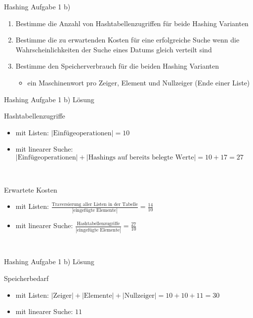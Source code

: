 	\begin{frame}{Hashing Aufgabe 1 b)}
		\begin{enumerate}
			\item Bestimme die Anzahl von Hashtabellenzugriffen für beide Hashing Varianten
			\item Bestimme die zu erwartenden Kosten für eine erfolgreiche Suche wenn die Wahrscheinlichkeiten der Suche eines Datums gleich verteilt sind
			\item Bestimme den Speicherverbrauch für die beiden Hashing Varianten
			\begin{itemize}
				\item ein Maschinenwort pro Zeiger, Element und Nullzeiger (Ende einer Liste) 
			\end{itemize}  
		\end{enumerate}
	\end{frame}

	\begin{frame} {Hashing Aufgabe 1 b) Lösung}
		\begin{block}{Hashtabellenzugriffe}
			\begin{itemize}
				\item mit Listen: $|\text{Einfügeoperationen}| = 10$
				\item mit linearer Suche: $|\text{Einfügeoperationen}| + |\text{Hashings auf bereits belegte Werte}| = 10 + 17 = 27 $
			\end{itemize}
		\end{block}
		\ \\
		\begin{block}{Erwartete Kosten}
			\begin{itemize}
				\item mit Listen: $ \frac{\text{Traversierung aller Listen in der Tabelle}}{|\text{eingefügte Elemente}|}= \frac{14}{10}  $
				\item mit linearer Suche: $ \frac{\text{Hashtabellenzugriffe}}{|\text{eingefügte Elemente}|} =  \frac{27}{10} $
			\end{itemize}
		\end{block}

		\ \\	


	\end{frame}

	\begin{frame}{Hashing Aufgabe 1 b) Lösung}
		\begin{block}{Speicherbedarf}
			\begin{itemize}
				\item mit Listen: $|\text{Zeiger}| + |\text{Elemente}| + |\text{Nullzeiger}| = 10 + 10 + 11 = 30$
				\item mit linearer Suche: $11$
			\end{itemize}
		\end{block}

	\end{frame}


